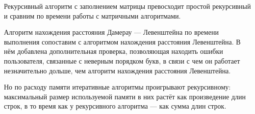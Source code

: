 Рекурсивный алгоритм с заполнением матрицы превосходит простой рекурсивный и сравним по времени работы с матричными алгоритмами. 

Алгоритм нахождения расстояния Дамерау — Левенштейна по времени выполнения сопоставим с алгоритмом нахождения расстояния Левенштейна. В нём добавлена дополнительная проверка, позволяющая находить ошибки пользователя, связанные с неверным порядком букв, в связи с чем он работает незначительно дольше, чем алгоритм нахождения расстояния Левенштейна.

Но по расходу памяти итеративные алгоритмы проигрывают рекурсивному: максимальный размер используемой памяти в них растёт как произведение длин строк, в то время как у рекурсивного алгоритма — как сумма длин строк.
